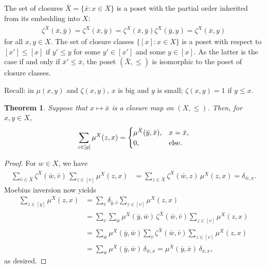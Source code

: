 \documentclass[12pt,a4paper]{amsart}
\newtheorem{theorem}{Theorem}[section]
\begin{document}
The set of closures $\bar{X} = \{\bar{x} : x \in X\}$ is a poset with
the partial order inherited from its embedding into $X$:
\begin{align*}
\zeta^{\bar{X}}(\bar{x}, \bar{y}) = \zeta^X(\bar{x}, \bar{y})
= \zeta^X(\bar{x}, \bar{y}) \zeta^X(\bar{y}, y)
= \zeta^X(\bar{x}, y)
\end{align*}
 for all $x, y \in X$.  The set of
closure classes $\{[x] : x \in X\}$ is a poset with respect to
$[x'] \leq [x]$ if $y' \leq y$ for some $y' \in [x']$ and some
$y \in [x]$.  As the latter is the case if and only if
$\bar{x}' \leq \bar{x}$, the poset $(\bar{X}, \leq)$ is isomorphic to
the poset of closure classes.

Recall: in $\mu(x, y)$ and $\zeta(x, y)$, $x$ is big and $y$ is small;
$\zeta(x, y) = 1$ if $y \leq x$.

\begin{theorem}
Suppose that $x \mapsto \bar{x}$ is a closure map on $(X, \leq)$.  Then,
for $x, y \in X$,
\begin{align*}
  \sum_{z \in [y]} \mu^X(z, x) =
  \begin{cases}
    \mu^{\bar{X}}(\bar{y}, \bar{x})\text, & x = \bar{x}\text, \\
0\text, & \text{else.}
  \end{cases}
\end{align*}
\end{theorem}

\begin{proof}
  For $w \in X$, we have
  \begin{align*}
    \sum_{\bar{v} \in \bar{X}} \zeta^{\bar{X}}(\bar{w}, \bar{v})\, \sum_{z \in [v]} \mu^X(z, x)
    &= \sum_{z \in X} \zeta^X(\bar{w}, z)\, \mu^X(z, x)  = \delta_{\bar{w},x}.
  \end{align*}
Moebius inversion now yields
\begin{align*}
  \sum_{z \in [y]} \mu^X(z, x)
&= \sum_{\bar{v}} \delta_{\bar{y},\bar{v}} \sum_{z \in [v]} \mu^X(z, x) \\
&= \sum_{\bar{v}} \sum_{\bar{w}} \mu^{\bar{X}} (\bar{y}, \bar{w})\, \zeta^{\bar{X}}(\bar{w}, \bar{v}) \sum_{z \in [v]} \mu^X(z, x) \\
&= \sum_{\bar{w}}  \mu^{\bar{X}} (\bar{y}, \bar{w}) \sum_{\bar{v}} \zeta^{\bar{X}}(\bar{w}, \bar{v}) \sum_{z \in [v]} \mu^X(z, x) \\
&= \sum_{\bar{w}}  \mu^{\bar{X}} (\bar{y}, \bar{w})\, \delta_{\bar{w}, x}
=  \mu^{\bar{X}} (\bar{y}, \bar{x})\, \delta_{\bar{x}, x},
\end{align*}
as desired.
\end{proof}
\end{document}
